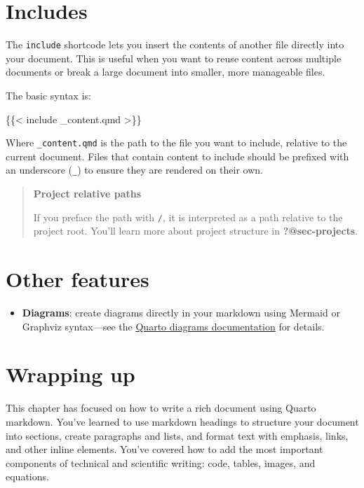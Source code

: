\documentclass[
  letterpaper,
  DIV=11,
  numbers=noendperiod,
  oneside]{scrreprt}
\newenvironment{Shaded}{\begin{snugshade}}{\end{snugshade}}
\newcommand{\NormalTok}[1]{\textcolor[rgb]{0.00,0.23,0.31}{#1}}
\providecommand{\tightlist}{%
  \setlength{\itemsep}{0pt}\setlength{\parskip}{0pt}}
\begin{document}
\begin{tcolorbox}
\section{Includes}\label{sec-includes}

The \texttt{include} shortcode lets you insert the contents of another
file directly into your document. This is useful when you want to reuse
content across multiple documents or break a large document into
smaller, more manageable files.

The basic syntax is:

\begin{Shaded}
\begin{Highlighting}[]
\NormalTok{\{\{\textless{} include \_content.qmd \textgreater{}\}\}}
\end{Highlighting}
\end{Shaded}

Where \texttt{\_content.qmd} is the path to the file you want to
include, relative to the current document. Files that contain content to
include should be prefixed with an underscore (\texttt{\_}) to ensure
they are rendered on their own.

\begin{quote}
\textbf{Project relative paths}

If you preface the path with \texttt{/}, it is interpreted as a path
relative to the project root. You'll learn more about project structure
in \textbf{?@sec-projects}.
\end{quote}

\section{Other features}\label{other-features}

\begin{itemize}
\tightlist
\item
  \textbf{Diagrams}: create diagrams directly in your markdown using
  Mermaid or Graphviz syntax---see the
  \href{https://quarto.org/docs/authoring/diagrams.html}{Quarto diagrams
  documentation} for details.
\end{itemize}

\section{Wrapping up}\label{wrapping-up}

This chapter has focused on how to write a rich document using Quarto
markdown. You've learned to use markdown headings to structure your
document into sections, create paragraphs and lists, and format text
with emphasis, links, and other inline elements. You've covered how to
add the most important components of technical and scientific writing:
code, tables, images, and equations.


\end{tcolorbox}
\end{document}
